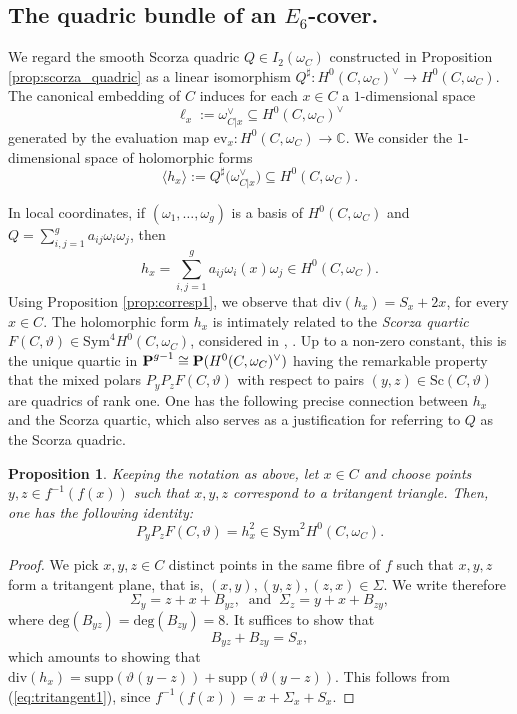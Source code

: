 \documentclass[11pt]{amsart}
\newtheorem{proposition}[theorem]{Proposition}
\theoremstyle{definition}
\def\PP{{\textbf P}}
\begin{document}
\subsection{The quadric bundle of an $E_6$-cover.} We regard the smooth Scorza quadric $Q\in I_2(\omega_C)$ constructed in Proposition \ref{prop:scorza_quadric} as a linear isomorphism  $Q^{\sharp}\colon H^0(C,\omega_C)^{\vee}\rightarrow H^0(C,\omega_C)$. The canonical embedding of $C$ induces for each $x\in C$ a $1$-dimensional space 
$$
\ell_x :=\omega_{C|x}^{\vee}\subseteq H^0(C,\omega_C)^{\vee}
$$ 
generated by the evaluation map $\mathrm{ev}_x\colon H^0(C,\omega_C)\rightarrow \mathbb C$. We consider the $1$-dimensional space of holomorphic forms  
\begin{equation}\label{eq:hx}
\langle h_x\rangle :=Q^{\sharp}\bigl(\omega_{C|x}^{\vee})\subseteq H^0(C,\omega_C).
\end{equation}

In local coordinates, if $(\omega_1,\ldots,  \omega_g)$ is a basis of $H^0(C,\omega_C)$ and $Q=\sum_{i,j=1}^g a_{ij}\omega_i \omega_j$, then 
$$h_x=\sum_{i,j=1}^g a_{ij}\omega_i(x)\omega_j\in H^0(C,\omega_C).$$
Using Proposition \ref{prop:corresp1}, we observe that $\mbox{div}(h_x)=S_x+2x$, for every $x\in C$. The holomorphic form $h_x$  is intimately related to the \emph{Scorza quartic} $F(C,\vartheta)\in \mbox{Sym}^4 H^0(C,\omega_C)$, considered in \cite{DK}, \cite[Theorem 6.2]{FI}. Up to a non-zero constant, this is the unique quartic in $\PP^{g-1}\cong \PP(H^0(C,\omega_C)^{\vee})$ having the remarkable property that the mixed polars $P_yP_z F(C,\vartheta)$ with respect to pairs $(y,z)\in \mbox{Sc}(C,\vartheta)$ are quadrics of rank one. One has the following precise connection between $h_x$ and the Scorza quartic, which also serves as a justification for referring to $Q$ as the Scorza quadric.

\begin{proposition}\label{prop:scorza_quar}
Keeping the notation as above, let $x\in C$ and choose points $y,z\in f^{-1}(f(x))$ such that $x,y,z$ correspond to a tritangent triangle. Then,  
one has the following identity:
$$P_yP_z F(C,\vartheta)=h_x^2\in \mathrm{Sym}^2 H^0(C,\omega_C).$$
\end{proposition}
\begin{proof}
We pick $x,y,z\in C$ distinct points in the same fibre of $f$ such that $x, y,z$ form a tritangent plane, that is,  $(x,y), (y,z), (z,x)\in \Sigma$. We write therefore
$$\Sigma_y=z+x+B_{yz}, \ \mbox{ and } \ \Sigma_z=y+x+B_{zy},$$
where $\mbox{deg}(B_{yz})=\mbox{deg}(B_{zy})=8$. It suffices to show that 
\begin{equation}\label{eq:sc2}
B_{yz}+B_{zy}=S_x,
\end{equation}
which  amounts to showing that $\mbox{div}(h_x)=\mbox{supp} (\vartheta(y-z))+\mbox{supp}(\vartheta(y-z))$. This follows from (\ref{eq:tritangent1}), since $f^{-1}(f(x))=x+\Sigma_x+S_x$.
\end{proof}
\end{document}
